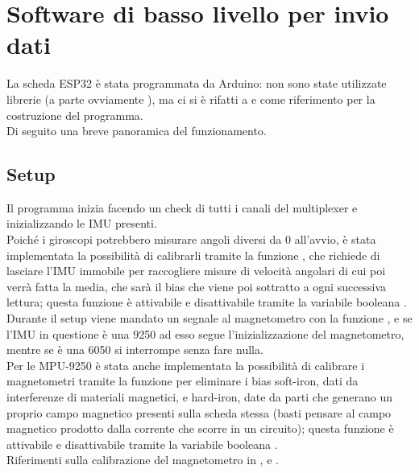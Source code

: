 \section{Software di basso livello per invio dati}

La scheda ESP32 è stata programmata da Arduino: non sono state utilizzate librerie (a parte ovviamente ), ma ci si è rifatti a \cite{MPU6050_tockn} e \cite{MPU9250} come riferimento per la costruzione del programma.\\
Di seguito una breve panoramica del funzionamento.

\subsection{Setup}

Il programma inizia facendo un check di tutti i canali del multiplexer e inizializzando le IMU presenti.\\
Poiché i giroscopi potrebbero misurare angoli diversi da 0 all'avvio, è stata implementata la possibilità di calibrarli tramite la funzione , che richiede di lasciare l'IMU immobile per raccogliere misure di velocità angolari di cui poi verrà fatta la media, che sarà il bias che viene poi sottratto a ogni successiva lettura; questa funzione è attivabile e disattivabile tramite la variabile booleana .\\

Durante il setup viene mandato un segnale al magnetometro con la funzione , e se l'IMU in questione è una 9250 ad esso segue l'inizializzazione del magnetometro, mentre se è una 6050 si interrompe senza fare nulla.\\
Per le MPU-9250 è stata anche implementata la possibilità di calibrare i magnetometri tramite la funzione  per eliminare i bias soft-iron, dati da interferenze di materiali magnetici, e hard-iron, date da parti che generano un proprio campo magnetico presenti sulla scheda stessa (basti pensare al campo magnetico prodotto dalla corrente che scorre in un circuito); questa funzione è attivabile e disattivabile tramite la variabile booleana .\\
Riferimenti sulla calibrazione del magnetometro in \cite{MPU9250}, \cite{ozyagcilar2012calibrating} e \cite{ozyagcilar2012implementing}.\\

